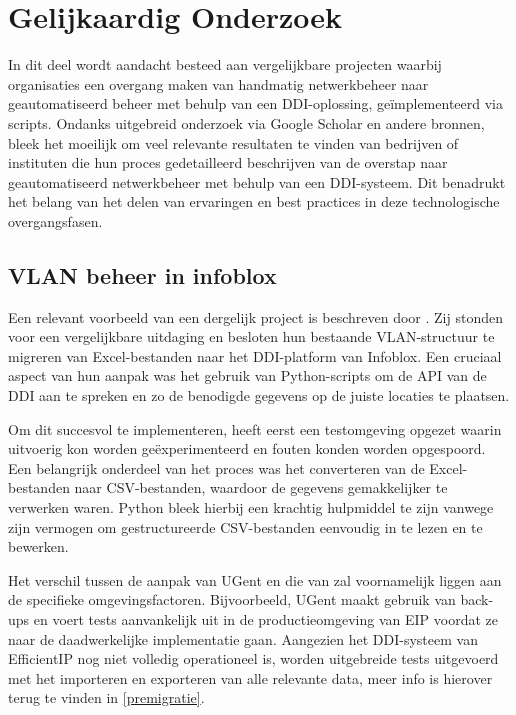 \section{Gelijkaardig Onderzoek}
In dit deel wordt aandacht besteed aan vergelijkbare projecten waarbij organisaties een overgang maken van handmatig netwerkbeheer naar geautomatiseerd beheer met behulp van een DDI-oplossing, geïmplementeerd via scripts. Ondanks uitgebreid onderzoek via Google Scholar en andere bronnen, bleek het moeilijk om veel relevante resultaten te vinden van bedrijven of instituten die hun proces gedetailleerd beschrijven van de overstap naar geautomatiseerd netwerkbeheer met behulp van een DDI-systeem. Dit benadrukt het belang van het delen van ervaringen en best practices in deze technologische overgangsfasen.

\subsection{VLAN beheer in infoblox}
Een relevant voorbeeld van een dergelijk project is beschreven door \textcite{Karaoui2023}. Zij stonden voor een vergelijkbare uitdaging en besloten hun bestaande VLAN-structuur te migreren van Excel-bestanden naar het DDI-platform van Infoblox. Een cruciaal aspect van hun aanpak was het gebruik van Python-scripts om de API van de DDI aan te spreken en zo de benodigde gegevens op de juiste locaties te plaatsen.

Om dit succesvol te implementeren, heeft \textcite{Karaoui2023} eerst een testomgeving opgezet waarin uitvoerig kon worden geëxperimenteerd en fouten konden worden opgespoord. Een belangrijk onderdeel van het proces was het converteren van de Excel-bestanden naar CSV-bestanden, waardoor de gegevens gemakkelijker te verwerken waren. Python bleek hierbij een krachtig hulpmiddel te zijn vanwege zijn vermogen om gestructureerde CSV-bestanden eenvoudig in te lezen en te bewerken.

Het verschil tussen de aanpak van UGent en die van \textcite{Karaoui2023} zal voornamelijk liggen aan de specifieke omgevingsfactoren. Bijvoorbeeld, UGent maakt gebruik van back-ups en voert tests aanvankelijk uit in de productieomgeving van EIP voordat ze naar de daadwerkelijke implementatie gaan. Aangezien het DDI-systeem van EfficientIP nog niet volledig operationeel is, worden uitgebreide tests uitgevoerd met het importeren en exporteren van alle relevante data, meer info is hierover terug te vinden in \ref{premigratie}.

